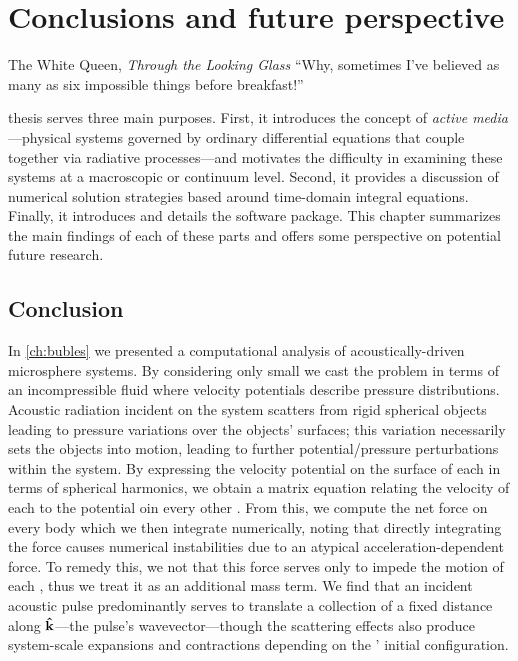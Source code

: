 \chapter{\label{ch:conclusions}Conclusions and future perspective}

\begin{frontquote}{The White Queen, \emph{Through the Looking Glass}}
  ``Why, sometimes I've believed as many as six impossible things before breakfast!''
\end{frontquote}

 thesis serves three main purposes.
First, it introduces the concept of \emph{active media}---physical systems governed by ordinary differential equations that couple together via radiative processes---and motivates the difficulty in examining these systems at a macroscopic or continuum level.
Second, it provides a discussion of numerical solution strategies based around time-domain integral equations.
Finally, it introduces and details the \QuEST{} software package.
This chapter summarizes the main findings of each of these parts and offers some perspective on potential future research. 

\section{Conclusion}

In \cref{ch:bubles} we presented a computational analysis of acoustically-driven microsphere systems.
By considering only small \bubbles{} we cast the problem in terms of an incompressible fluid where velocity potentials describe pressure distributions.
Acoustic radiation incident on the system scatters from rigid spherical objects leading to pressure variations over the objects' surfaces; this variation necessarily sets the objects into motion, leading to further potential/pressure perturbations within the system.
By expressing the velocity potential on the surface of each \bubble{} in terms of spherical harmonics, we obtain a matrix equation relating the velocity of each \bubble{} to the potential oin every other \bubble{}.
From this, we compute the net force on every body which we then integrate numerically, noting that directly integrating the force causes numerical instabilities due to an atypical acceleration-dependent force.
To remedy this, we not that this force serves only to impede the motion of each \bubble{}, thus we treat it as an additional mass term.
We find that an incident acoustic pulse predominantly serves to translate a collection of \bubbles{} a fixed distance along $\vu{k}$---the pulse's wavevector---though the scattering effects also produce system-scale expansions and contractions depending on the \bubbles' initial configuration.

